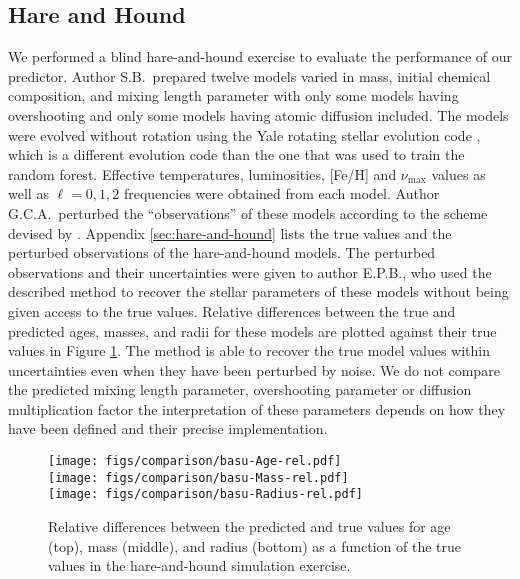 \documentclass[twocolumn,twocolappendix]{aastex6}
\newcommand{\colwidth}{\linewidth}
\newif\ifref
\newcommand{\mb}[1]{\ifref\boldmath\textbf{#1}\unboldmath\else #1\fi}
\begin{document}
\subsection{Hare and Hound} 
\label{sec:hnh}
We performed a blind hare-and-hound exercise to evaluate the performance of our predictor. Author S.B.\ prepared twelve models varied in mass, initial chemical composition, and mixing length parameter with only some models having overshooting and only some models having atomic diffusion included. The models were evolved without rotation using the Yale rotating stellar evolution code \citep[YREC;][]{2008ApSS.316...31D}, which is a different evolution code than the one that was used to train the random forest. Effective temperatures, luminosities, [Fe/H] and $\nu_{\max}$ values as well as $\ell=0,1,2$ frequencies were obtained from each model. Author G.C.A.\  perturbed the ``observations'' of these models according to the scheme devised by \citet{spaceinn}. \mb{Appendix \ref{sec:hare-and-hound} lists the true values and the perturbed observations of the hare-and-hound models}. The perturbed observations and their uncertainties were given to author E.P.B.\@, who used the described method to recover the stellar parameters of \mb{these} models without being given access to the true values. Relative differences between the true and predicted ages, masses, and radii for these models are plotted against their true values in Figure \ref{fig:hare-comparison}. The method is able to recover the true model values within uncertainties even when they have been perturbed by noise. We do not compare the predicted mixing length parameter, overshooting parameter or diffusion \mb{multiplication} factor \mb{the interpretation of these parameters depends on how they have been defined and their precise implementation.}%

\begin{figure}
    \centering
    \texttt{[image: figs/comparison/basu-Age-rel.pdf]}\\
    \texttt{[image: figs/comparison/basu-Mass-rel.pdf]}\\
    \texttt{[image: figs/comparison/basu-Radius-rel.pdf]}
    \caption{Relative differences between the predicted and true values for age (top), mass (middle), and radius (bottom) as a function of the true values in \mb{the} hare-and-hound simulation exercise. \vspace*{5mm} %
    \label{fig:hare-comparison}}
\end{figure}
\end{document}
